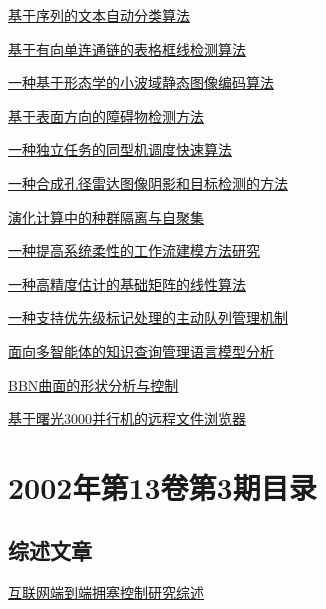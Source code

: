 \documentclass[a4paper]{article}
\begin{document}
\href{http://www.jos.org.cn/ch/reader/download_pdf.aspx?file_no=20020445&year_id=2002&quarter_id=4&falg=1}{基于序列的文本自动分类算法}

\href{http://www.jos.org.cn/ch/reader/download_pdf.aspx?file_no=20020446&year_id=2002&quarter_id=4&falg=1}{基于有向单连通链的表格框线检测算法}

\href{http://www.jos.org.cn/ch/reader/download_pdf.aspx?file_no=20020447&year_id=2002&quarter_id=4&falg=1}{一种基于形态学的小波域静态图像编码算法}

\href{http://www.jos.org.cn/ch/reader/download_pdf.aspx?file_no=20020448&year_id=2002&quarter_id=4&falg=1}{基于表面方向的障碍物检测方法}

\href{http://www.jos.org.cn/ch/reader/download_pdf.aspx?file_no=20020449&year_id=2002&quarter_id=4&falg=1}{一种独立任务的同型机调度快速算法}

\href{http://www.jos.org.cn/ch/reader/download_pdf.aspx?file_no=20020450&year_id=2002&quarter_id=4&falg=1}{一种合成孔径雷达图像阴影和目标检测的方法}

\href{http://www.jos.org.cn/ch/reader/download_pdf.aspx?file_no=20020451&year_id=2002&quarter_id=4&falg=1}{演化计算中的种群隔离与自聚集}

\href{http://www.jos.org.cn/ch/reader/download_pdf.aspx?file_no=20020452&year_id=2002&quarter_id=4&falg=1}{一种提高系统柔性的工作流建模方法研究}

\href{http://www.jos.org.cn/ch/reader/download_pdf.aspx?file_no=20020453&year_id=2002&quarter_id=4&falg=1}{一种高精度估计的基础矩阵的线性算法}

\href{http://www.jos.org.cn/ch/reader/download_pdf.aspx?file_no=20020454&year_id=2002&quarter_id=4&falg=1}{一种支持优先级标记处理的主动队列管理机制}

\href{http://www.jos.org.cn/ch/reader/download_pdf.aspx?file_no=20020455&year_id=2002&quarter_id=4&falg=1}{面向多智能体的知识查询管理语言模型分析}

\href{http://www.jos.org.cn/ch/reader/download_pdf.aspx?file_no=20020456&year_id=2002&quarter_id=4&falg=1}{BBN曲面的形状分析与控制}

\href{http://www.jos.org.cn/ch/reader/download_pdf.aspx?file_no=20020457&year_id=2002&quarter_id=4&falg=1}{基于曙光3000并行机的远程文件浏览器}


\section{\textbf{2002年第13卷第3期目录}}
\subsection{综述文章}
\href{http://www.jos.org.cn/ch/reader/download_pdf.aspx?file_no=20020305&year_id=2002&quarter_id=3&falg=1}{互联网端到端拥塞控制研究综述}
\end{document}
